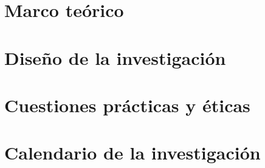 \documentclass[draft,12pt,headsepline,footsepline,paper=letter]{scrreprt}
\begin{document}
\section{Marco teórico}
\section{Diseño de la investigación}
\section{Cuestiones prácticas y éticas}
\section{Calendario de la investigación}

\end{document}
